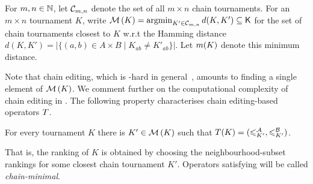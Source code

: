 \begin{definition}
    For $m, n \in \mathbb{N}$, let $\mathcal{C}_{m,n}$ denote the set of all $m \times n$
    chain tournaments. For an $m \times n$ tournament $K$,
    write $\operatorname{\mathcal{M}}\left({K}\right) = \operatorname{argmin}_{K' \in \mathcal{C}_{m,n}}{d(K, K')} \subseteq \mathsf{K}$ for
    the set of chain tournaments closest to $K$ w.r.t the Hamming
    distance $d(K, K') = |\{(a,b) \in A \times B \mid K_{ab} \ne K'_{ab}\}|$.
    Let $m({K})$ denote this minimum distance.
\end{definition}

Note that chain editing, which is -hard in
general~\cite{jiao2017algorithms}, amounts to finding a single element of
$\operatorname{\mathcal{M}}\left({K}\right)$.\footnotemark{} We comment further on the computational complexity
of chain editing in . The following
property characterises chain editing-based operators $T$.


\begin{axiom}[\chainmin{}]
    For every tournament $K$ there is $K' \in \operatorname{\mathcal{M}}\left({K}\right)$ such that $T(K) =
    ({\leqslant^{\mathcal{A}}_{K'}}, {\leqslant^{\mathcal{B}}_{K'}})$.
\end{axiom}

\sloppy
That is, the ranking of $K$ is obtained by choosing the neighbourhood-subset
rankings for some closest chain tournament $K'$. Operators satisfying
\chainmin{} will be called \emph{chain-minimal}.

